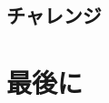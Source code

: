 \documentclass[dvipdfmx]{jsarticle}
\begin{document}
\subsection{チャレンジ}

\clearpage

\section{最後に}


\clearpage
\begin{thebibliography}{9}
\end{thebibliography}
\end{document}
